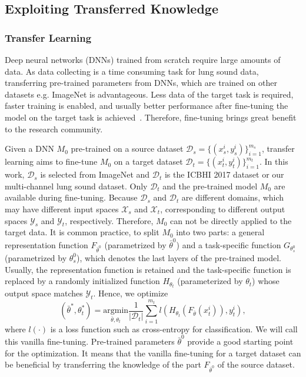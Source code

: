 \documentclass[journal]{IEEEtran}
\begin{document}
\subsection{Exploiting Transferred Knowledge}
\subsubsection{Transfer Learning}
Deep neural networks (DNNs) trained from scratch require large amounts of data. As data collecting is a time consuming task for lung sound data, transferring pre-trained parameters from DNNs, which are trained on other datasets e.g. ImageNet is advantageous. Less data of the target task is required, faster training is enabled, and usually better performance after fine-tuning the model on the target task is achieved~\cite{he2019rethinking}. Therefore, fine-tuning brings great benefit to the research community.   

Given a DNN $M_0$ pre-trained on a source dataset $\mathcal{D}_s=\{(x^{i}_{s}, y^{i}_s)\}^{m_s}_{i=1}$, transfer learning aims to fine-tune $M_0$ on a target dataset $\mathcal{D}_t=\{(x^{i}_{t}, y^{i}_t)\}^{m_t}_{i=1}$. In this work, $\mathcal{D}_s$ is selected from ImageNet and $\mathcal{D}_t$ is the ICBHI 2017 dataset or our multi-channel lung sound dataset. Only $\mathcal{D}_t$ and the pre-trained model $M_0$ are available during fine-tuning. 
Because $\mathcal{D}_s$ and $\mathcal{D}_t$ are different domains, which may have different input spaces $\mathcal{X}_s$ and  $\mathcal{X}_t$, corresponding to different output spaces $\mathcal{Y}_s$ and  $\mathcal{Y}_t$, respectively. Therefore, $M_0$ can not be directly applied to the target data. It is common practice, to split $M_0$ into two parts: a general representation function $F_{{\bar{\theta}}^0}$ (parametrized by ${\bar{\theta}}^0$) and a task-specific function $G_{\theta^0_s}$ (parametrized by $\theta^0_s$), which denotes the last layers of the pre-trained model. Usually, the representation function is retained and the task-specific function is replaced by a randomly initialized function $H_{\theta_t}$ (parameterized by $\theta_t$) whose output space matches $\mathcal{Y}_t$. Hence, we optimize 
\begin{equation}\label{tfloss}
    ({\bar{\theta}}^*, \theta^*_t) = \underset{\bar{\theta},\theta_t }{\text{argmin}}\frac{1}{\left | \mathcal{D}_t \right |}\sum_{i=1}^{m_t}l(H_{\theta_t}(F_{\bar{\theta}}(x^i_t)), y^i_t),
\end{equation}
where $l(\cdot)$ is a loss function such as cross-entropy for classification. We will call this vanilla fine-tuning. Pre-trained parameters ${\bar{\theta}}^0$ provide a good starting point for the optimization. It means that the vanilla fine-tuning for a target dataset can be beneficial by transferring the knowledge of the part $F_{{\bar{\theta}}^0}$ of the source dataset.
\end{document}
